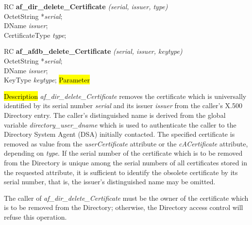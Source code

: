 RC {\bf af\_dir\_delete\_Certificate} {\em (serial, issuer, type)} \\
OctetString *{\em serial}; \\
DName {\em *issuer}; \\
CertificateType {\em type}; 

RC {\bf af\_afdb\_delete\_Certificate} {\em (serial, issuer, keytype)} \\
OctetString *{\em serial}; \\
DName {\em *issuer}; \\
KeyType {\em keytype};
\hl{Parameter}




\hl{Description}
{\em af\_dir\_delete\_Certificate} removes the certificate which is universally 
identified by its serial number {\em serial} and its issuer {\em issuer} from the 
caller's X.500 Directory entry. The caller's distinguished name is derived from
the global variable {\em directory\_user\_dname} which is used to authenticate the caller to the
Directory System Agent (DSA) initially contacted.
The specified certificate is removed as value from the
{\em userCertificate} attribute or the {\em cACertificate} attribute, depending
on {\em type}.
If the serial number of the certificate which is to be removed from the Directory 
is unique among the serial numbers of all certificates stored in the requested attribute, 
it is sufficient to identify the obsolete certificate by its serial number, that is, 
the issuer's distinguished name may be omitted.

The caller of {\em af\_dir\_delete\_Certificate} must be the owner of the certificate
which is to be removed from the Directory; otherwise, the Directory access control
will refuse this operation.

